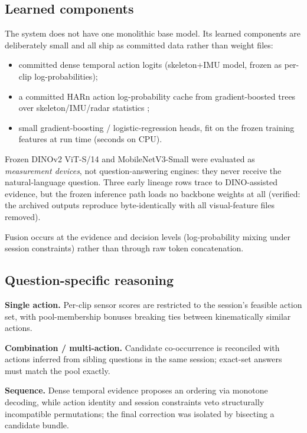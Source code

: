 \documentclass[12pt,a4paper]{article}
\begin{document}
\subsection{Learned components}

The system does not have one monolithic base model. Its learned components are
deliberately small and all ship as committed data rather than weight files:

\begin{itemize}
    \item committed dense temporal action logits (skeleton+IMU model, frozen as per-clip log-probabilities);
    \item a committed HARn action log-probability cache from gradient-boosted trees over skeleton/IMU/radar statistics \cite{sklearn};
    \item small gradient-boosting / logistic-regression heads, fit on the frozen training features at run time (seconds on CPU).
\end{itemize}

Frozen DINOv2 ViT-S/14 \cite{dinov2} and MobileNetV3-Small \cite{mobilenetv3}
were evaluated as \emph{measurement devices}, not question-answering engines:
they never receive the natural-language question. Three early lineage rows
trace to DINO-assisted evidence, but the frozen inference path loads no
backbone weights at all (verified: the archived outputs reproduce byte-identically
with all visual-feature files removed).

Fusion occurs at the evidence and decision levels (log-probability mixing under
session constraints) rather than through raw token concatenation.

\subsection{Question-specific reasoning}

\textbf{Single action.}
Per-clip sensor scores are restricted to the session's feasible action set,
with pool-membership bonuses breaking ties between kinematically similar actions.

\textbf{Combination / multi-action.}
Candidate co-occurrence is reconciled with actions inferred from sibling
questions in the same session; exact-set answers must match the pool exactly.

\textbf{Sequence.}
Dense temporal evidence proposes an ordering via monotone decoding, while
action identity and session constraints veto structurally incompatible
permutations; the final correction was isolated by bisecting a candidate bundle.
\end{document}
